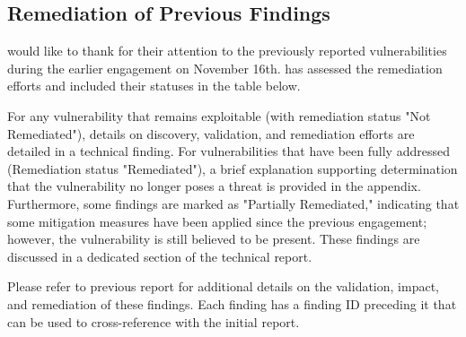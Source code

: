 \subsection{Remediation of Previous Findings}

    \team would like to thank \client for their attention to the previously reported vulnerabilities during the earlier engagement on November 16th. \team has assessed the remediation efforts and included their statuses in the table below.

    For any vulnerability that remains exploitable (with remediation status "Not Remediated"), details on discovery, validation, and remediation efforts are detailed in a technical finding. For vulnerabilities that have been fully addressed (Remediation status "Remediated"), a brief explanation supporting \teamP determination that the vulnerability no longer poses a threat is provided in the appendix. Furthermore, some findings are marked as "Partially Remediated," indicating that some mitigation measures have been applied since the previous engagement; however, the vulnerability is still believed to be present. These findings are discussed in a dedicated section of the technical report.
    
    Please refer to \teamP previous report for additional details on the validation, impact, and remediation of these findings.     Each finding has a finding ID preceding it that can be used to cross-reference with the initial report. 

    \renewcommand{\currentFindingBackground}{lowGreen}
    
    \renewcommand{\currentFindingColor}{criticalPurple}
    
    


   

    \renewcommand{\currentFindingColor}{highRed}


    \renewcommand{\currentFindingColor}{mediumOrange}

    \renewcommand{\currentFindingBackground}{lowGreen}

